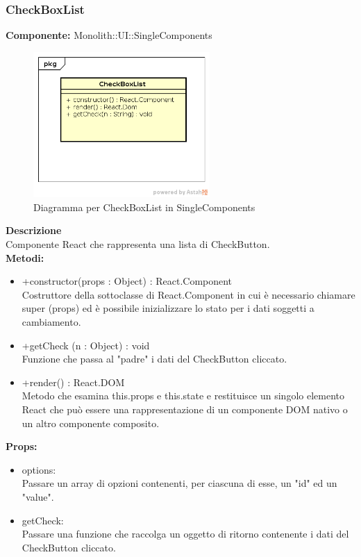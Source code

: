 \clearpage

\subsubsection{CheckBoxList}
\textbf{Componente:}  Monolith::UI::SingleComponents\\
   \FloatBarrier
   \begin{figure}[ht]
   \centering
   \includegraphics[width=0.6\textwidth]{img/single-CheckBoxList.png}
   \caption{{Diagramma per CheckBoxList in SingleComponents}}
\end{figure}
\FloatBarrier
\textbf{Descrizione}\\
Componente React che rappresenta una lista di CheckButton. \\
\textbf{Metodi:} 
\begin{itemize}
\item +constructor(props : Object) : React.Component 
\\
Costruttore della sottoclasse di React.Component in cui è necessario chiamare super (props) ed è possibile inizializzare lo stato per i dati soggetti a cambiamento.

\item +getCheck (n : Object) : void \\
Funzione che passa al "padre" i dati del CheckButton cliccato. 

\item +render() : React.DOM 
\\
Metodo che esamina this.props e this.state e restituisce un singolo elemento React che può essere una rappresentazione di un componente DOM nativo o un altro componente composito.

\end{itemize}

\textbf{Props:} 
\begin{itemize}
\item options: 
\\
Passare un array di opzioni contenenti, per ciascuna di esse, un "id" ed un "value".
\item getCheck: 
\\
Passare una funzione che raccolga un oggetto di ritorno contenente i dati del CheckButton cliccato.

\end{itemize} 


